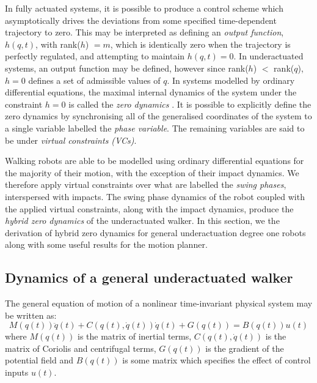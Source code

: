 In fully actuated systems, it is possible to produce a control scheme which asymptotically drives the deviations from some specified time-dependent trajectory to zero. This may be interpreted as defining an \textit{output function}, $h(q,t)$, with rank($h$) $= m$, which is identically zero when the trajectory is perfectly regulated, and attempting to maintain $h(q,t) = 0$. In underactuated systems, an output function may be defined, however since rank($h$) $<$ rank($q$), $h = 0$ defines a set of admissible values of $q$. In systems modelled by ordinary differential equations, the maximal internal dynamics of the system under the constraint $h=0$ is called the \textit{zero dynamics} \cite{isidori1995nonlinear}. It is possible to explicitly define the zero dynamics by synchronising all of the generalised coordinates of the system to a single variable labelled the \textit{phase variable}. The remaining variables are said to be under \textit{virtual constraints (VCs)}. %

Walking robots are able to be modelled using ordinary differential equations for the majority of their motion, with the exception of their impact dynamics. We therefore apply virtual constraints over what are labelled the \textit{swing phases}, interspersed with impacts. The swing phase dynamics of the robot coupled with the applied virtual constraints, along with the impact dynamics, produce the \textit{hybrid zero dynamics} of the underactuated walker. In this section, we the derivation of hybrid zero dynamics for general underactuation degree one robots along with some useful results for the motion planner.

\subsection{Dynamics of a general underactuated walker}
The general equation of motion of a nonlinear time-invariant physical system may be written as:
\begin{equation}\label{eqn:dynamics}
	M\left(q(t)\right)\ddot{q}(t) + C\left(q(t),\dot{q}(t)\right)\dot{q}(t)
	 + G\left(q(t)\right) = B\left(q(t)\right)u(t)
\end{equation}
where $M\left(q(t)\right)$ is the matrix of inertial terms, $C\left(q(t),\dot{q}(t)\right)$ is the matrix of Coriolis and centrifugal terms, $G\left(q(t)\right)$ is the gradient of the potential field and $B\left(q(t)\right)$ is some matrix which specifies the effect of control inputs $u(t)$. 

